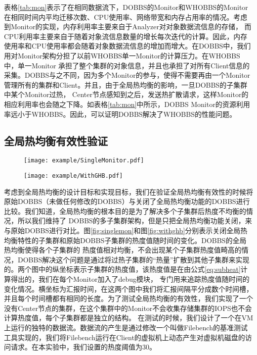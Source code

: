 表格\ref{tab:mon}表示了在相同数据流下，DOBBS的Monitor和WHOBBS的Monitor在相同时间内平均迁移次数、CPU使用率、网络带宽和内存占用率的情况。考虑到Monitor的实现，内存利用率主要来自于Analyzer对对象数据流信息的存储，
而CPU利用率主要来自于随着对象流信息数量的增长每次迭代的计算。因此，内存使用率和CPU使用率都会随着对象数据流信息的增加而增大。在DOBBS中，我们用对Monitor架构分担了以前WHOBBS单一Monitor的计算压力。在WHOBBS中，单一Monitor
承担了整个集群的对象信息，并且也承担了对所有Client信息的采集。DOBBS与之不同，因为多个Monitor的参与，使得不需要再由一个Monitor管理所有的集群和Client。并且，由于全局热均衡的影响，一旦DOBBS的子集群中某个Monitor过热，
Center节点感知到之后，发送热扩散请求，这样Monitor的相应利用率也会随之下降。如表格\ref{tab:mon}中所示，DOBBS Monitor的资源利用率远小于WHOBBS。因此，可以证明DOBBS解决了WHOBBS的性能问题。

\subsection{全局热均衡有效性验证}
\begin{figure}[!htp]
    \centering
    \texttt{[image: example/SingleMonitor.pdf]}
\end{figure}

\begin{figure}[!htp]
    \centering
    \texttt{[image: example/WithGHB.pdf]}
\end{figure}

考虑到全局热均衡的设计目标和实现目标，我们在验证全局热均衡有效性的时候将原始DOBBS（未做任何修改的DOBBS）与关闭了全局热均衡功能的DOBBS进行比较。我们知道，全局热均衡的根本目的是为了解决多个子集群后热度不均衡的情况，所以我们维持了
DOBBS的多子集群架构，但是只把全局热均衡功能关闭，来与原始DOBBS进行对比。图\ref{fig:singlemon}和图\ref{fig:withghb}分别表示关闭全局热均衡特性的子集群和原始DOBBS子集群的热度值随时间的变化。DOBBS的全局热均衡使得各个子集群的
热度值相对均衡，不会出现某个子集群热度值畸高的情况，DOBBS解决这个问题是通过将过热子集群的“热量”扩散到其他子集群来实现的。两个图中的纵坐标表示子集群的热度值，该热度值是在由公式\ref{eq:subheat}计算得出的，我们在每个Monitor加入了debug模块，
专门用来追踪热度值随时间的变化情况。横坐标为汇报时间，在这两个图中我们将汇报间隔平分成数个时间槽，并且每个时间槽都有相同的长度。为了测试全局热均衡的有效性，我们实现了一个没有Center节点的集群，在这个集群中的Monitor不会收集存储集群的IOPS也不会计算热度值，每个子集群都是独立的结构。
在测试的时候，我们设计了一个在VM上运行的独特的数据流。数据流的产生是通过修改一个叫做Filebench的基准测试工具实现的，我们将Filebench运行在Client的虚拟机上动态产生对虚拟机磁盘的访问请求。在本实验中，我们设置的热度阈值为30。

